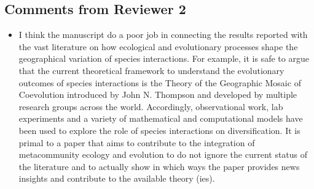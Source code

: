 \documentclass[12pt]{article}
\begin{document}
\subsection*{Comments from Reviewer 2}

\begin{itemize}
\item I think the manuscript do a poor job in connecting the results
  reported with the vast literature on how ecological and evolutionary
  processes shape the geographical variation of species
  interactions. For example, it is safe to argue that the current
  theoretical framework to understand the evolutionary outcomes of
  species interactions is the Theory of the Geographic Mosaic of
  Coevolution introduced by John N. Thompson and developed by multiple
  research groups across the world. Accordingly, observational work,
  lab experiments and a variety of mathematical and computational
  models have been used to explore the role of species interactions on
  diversification. It is primal to a paper that aims to contribute to
  the integration of metacommunity ecology and evolution to do not
  ignore the current status of the literature and to actually show in
  which ways the paper provides news insights and contribute to the
  available theory (ies).


\end{itemize}
\end{document}
